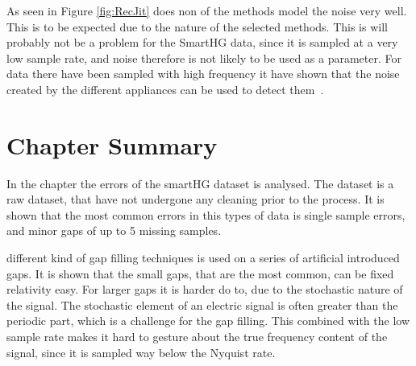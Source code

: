 As seen in Figure \ref{fig:RecJit} does non of the methods model the noise very well. This is to be expected due to the nature of the selected methods. This is will probably not be a problem for the SmartHG data, since it is sampled at a very low sample rate, and noise therefore is not likely to be used as a parameter. For data there have been sampled with high frequency it have shown that the noise created by the different appliances can be used to detect them~\citep{RefWorks:17}. 

\section{Chapter Summary}
In the chapter the errors of the smartHG dataset is analysed. The dataset is a raw dataset, that have not undergone any cleaning prior to the process. It is shown that the most common errors in this types of data is single sample errors, and minor gaps of up to 5 missing samples.  

different kind of gap filling techniques is used on a series of artificial introduced gaps. It is shown that the small gaps, that are the most common, can be fixed relativity easy. For larger gaps it is harder do to, due to the stochastic nature of the signal. The stochastic element of an electric signal is often greater than the periodic part, which is a challenge for the gap filling. This combined with the low sample rate makes it hard to gesture about the true frequency content of the signal, since it is sampled way below the Nyquist rate.  
